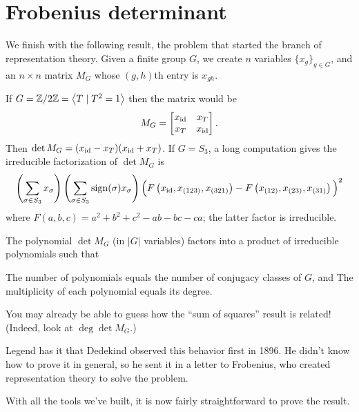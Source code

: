 \section{Frobenius determinant}
We finish with the following result,
the problem that started the branch of representation theory.
Given a finite group $G$,
we create $n$ variables $\{x_g\}_{g \in G}$,
and an $n \times n$ matrix $M_G$ whose $(g,h)$th entry is $x_{gh}$.
\begin{example}
	\listhack
	\begin{enumerate}[(a)]
	\ii If $G = \mathbb Z/2\mathbb Z = \left< T \mid T^2 = 1\right>$
	then the matrix would be \[ M_G =
	\begin{bmatrix} x_{\mathrm{id}} & x_T \\ x_T & x_{\mathrm{id}} \end{bmatrix}. \]
	Then $\det M_G = (x_{\mathrm{id}}-x_T)(x_{\mathrm{id}}+x_T)$.
	\ii If $G = S_3$, a long computation gives
	the irreducible factorization of $\det M_G$ is
	\[
		\left( \sum_{\sigma \in S_3} x_{\sigma} \right)
		\left( \sum_{\sigma \in S_3} \operatorname{sign}(\sigma)x_\sigma \right)
		\Big( F\left(x_{\mathrm{id}}, x_{(123)}, x_{(321)}\right)
		- F\left(x_{(12)}, x_{(23)}, x_{(31)}\right) \Big)^2 \]
	where $F(a,b,c) = a^2+b^2+c^2-ab-bc-ca$;
	the latter factor is irreducible.
	\end{enumerate}
\end{example}
\begin{theorem}
	The polynomial $\det M_G$ (in $|G|$ variables) factors
	into a product of irreducible polynomials such that
	\begin{enumerate}[(i)]
		\ii The number of polynomials equals the number
		of conjugacy classes of $G$, and
		\ii The multiplicity of each polynomial
		equals its degree.
	\end{enumerate}
\end{theorem}
You may already be able to guess how the ``sum of squares'' result
is related! (Indeed, look at $\deg\det M_G$.)

Legend has it that Dedekind observed this behavior first in 1896.
He didn't know how to prove it in general,
so he sent it in a letter to Frobenius,
who created representation theory to solve the problem.

With all the tools we've built, it is now fairly straightforward
to prove the result.

